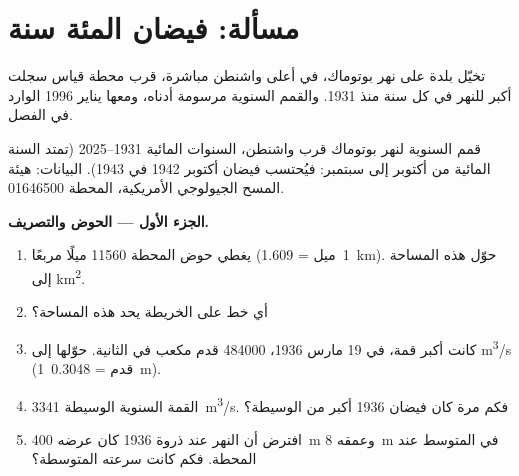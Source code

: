 \section{مسألة: فيضان المئة سنة}

\begin{problem}
\label{pb:g10:drainage-basins:1}
تخيّل بلدة على نهر بوتوماك، في أعلى واشنطن مباشرة، قرب محطة
قياس سجلت أكبر  للنهر في كل سنة منذ 1931. والقمم السنوية مرسومة أدناه،
ومعها  يناير 1996 الوارد في
الفصل.

\begin{center}

{\small قمم  السنوية لنهر بوتوماك قرب واشنطن، السنوات
المائية 1931--2025 (تمتد السنة المائية من أكتوبر إلى سبتمبر: فيُحتسب فيضان
أكتوبر 1942 في 1943). البيانات: هيئة المسح الجيولوجي الأمريكية، المحطة 01646500.}
\end{center}

\medskip
\noindent\textbf{الجزء الأول --- الحوض والتصريف.}
\begin{enumerate}
  \item يغطي حوض المحطة \num{11560} ميلًا مربعًا
        (\num{1}~ميل = \qty{1.609}{km}). حوّل هذه المساحة إلى
        \unit{km^2}.
  \item أي خط على الخريطة يحد هذه المساحة؟
  \item كانت أكبر قمة، في 19 مارس 1936، \num{484000} قدم مكعب في
        الثانية. حوّلها إلى \unit{m^3/s} (\num{1}~قدم =
        \qty{0.3048}{m}).
  \item القمة السنوية الوسيطة \qty{3341}{m^3/s}. فكم مرة كان فيضان 1936 أكبر
        من الوسيطة؟
  \item افترض أن النهر عند ذروة 1936 كان عرضه \qty{400}{m} وعمقه
        \qty{8}{m} في المتوسط عند المحطة. فكم كانت سرعته
        المتوسطة؟
\end{enumerate}


\end{problem}
